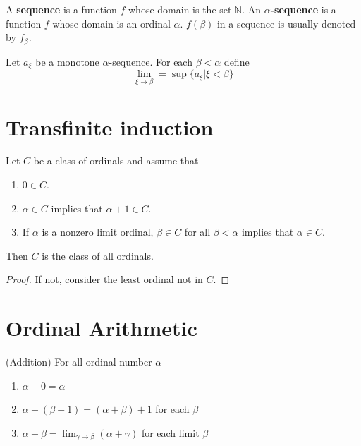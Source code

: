 \documentclass[12pt]{book}
\begin{document}
\begin{definition}
	A {\bf sequence} is a function $f$ whose domain is the set $\mathbb N$. An {\bf$\alpha$-sequence} is a function $f$ whose domain is an ordinal $\alpha$. $f(\beta)$ in a sequence is usually denoted by $f_\beta$. 
\end{definition}

\begin{definition}
	Let $a_\xi$ be a monotone $\alpha$-sequence. For each $\beta<\alpha$ define
	\begin{equation}
		\lim_{\xi\rightarrow\beta}=\sup\{a_\xi|\xi<\beta\}
	\end{equation}
\end{definition}

\section{Transfinite induction}

\begin{theorem}
	Let $C$ be a class of ordinals and assume that 
	\begin{enumerate}
		\item $0\in C$.
		\item $\alpha\in C$ implies that $\alpha+1\in C$.
		\item If $\alpha$ is a nonzero limit ordinal, $\beta\in C$ for all $\beta<\alpha$ implies that $\alpha\in C$.
	\end{enumerate}
	Then $C$ is the class of all ordinals.
\end{theorem}
\begin{proof}
	If not, consider the least ordinal not in $C$.
\end{proof}

\section{Ordinal Arithmetic}

\begin{definition}(Addition)
	For all ordinal number $\alpha$
	\begin{enumerate}
		\item $\alpha+0=\alpha$
		\item $\alpha+(\beta+1)=(\alpha+\beta)+1$ for each $\beta$
		\item $\alpha+\beta=\lim_{\gamma\rightarrow\beta}(\alpha+\gamma)$ for each limit $\beta$
	\end{enumerate}
\end{definition}
\end{document}
